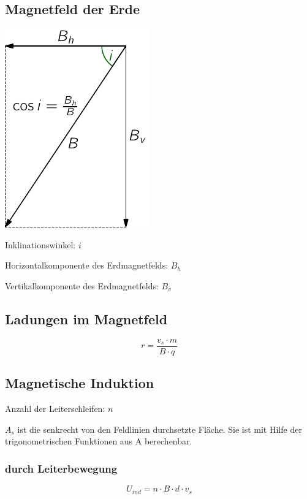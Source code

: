 \subsection{Magnetfeld der Erde}
\includegraphics[width=.4\linewidth]{magnetfeld_der_erde} \hfill
\begin{minipage}[b]{.55\linewidth}\raggedright
Inklinationswinkel: $i$

Horizontalkomponente des Erdmagnetfelds: $B_h$

Vertikalkomponente des Erdmagnetfelds: $B_v$
\end{minipage}

\subsection{Ladungen im Magnetfeld}
\begin{equation}\label{eq:magnetfeld:elektronen:kreisbahn}
r = \frac{v_s \cdot m}{B \cdot q}
\end{equation}

\subsection{Magnetische Induktion}
Anzahl der Leiterschleifen: $n$

$A_s$ ist die senkrecht von den Feldlinien durchsetzte Fläche. Sie ist mit Hilfe der trigonometrischen Funktionen aus A berechenbar.
 
\subsubsection{durch Leiterbewegung}
\begin{equation}\label{eq:magnetische:induktion:leiterbewegung}
U_{ind} = n \cdot B \cdot d \cdot v_s
\end{equation}

